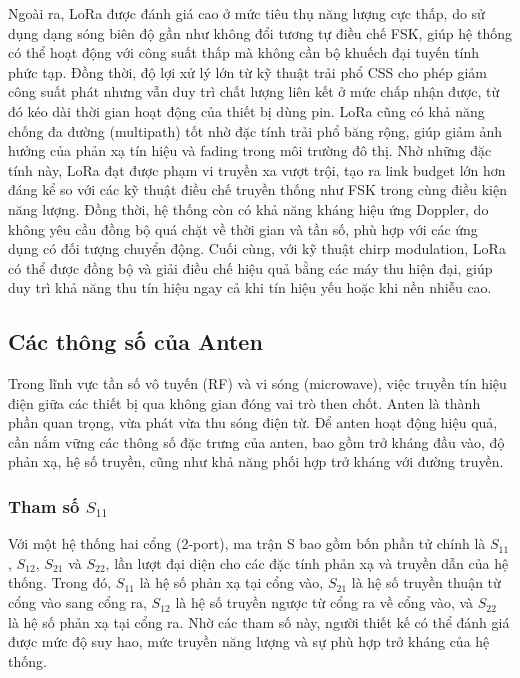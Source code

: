 \documentclass{article}
\begin{document}
	Ngoài ra, LoRa được đánh giá cao ở mức tiêu thụ năng lượng cực thấp, do sử dụng dạng sóng biên độ gần như không đổi tương tự điều chế FSK, giúp hệ thống có thể hoạt động với công suất thấp mà không cần bộ khuếch đại tuyến tính phức tạp. Đồng thời, độ lợi xử lý lớn từ kỹ thuật trải phổ CSS cho phép giảm công suất phát nhưng vẫn duy trì chất lượng liên kết ở mức chấp nhận được, từ đó kéo dài thời gian hoạt động của thiết bị dùng pin. LoRa cũng có khả năng chống đa đường (multipath) tốt nhờ đặc tính trải phổ băng rộng, giúp giảm ảnh hưởng của phản xạ tín hiệu và fading trong môi trường đô thị. Nhờ những đặc tính này, LoRa đạt được phạm vi truyền xa vượt trội, tạo ra link budget lớn hơn đáng kể so với các kỹ thuật điều chế truyền thống như FSK trong cùng điều kiện năng lượng. Đồng thời, hệ thống còn có khả năng kháng hiệu ứng Doppler, do không yêu cầu đồng bộ quá chặt về thời gian và tần số, phù hợp với các ứng dụng có đối tượng chuyển động. Cuối cùng, với kỹ thuật chirp modulation, LoRa có thể được đồng bộ và giải điều chế hiệu quả bằng các máy thu hiện đại, giúp duy trì khả năng thu tín hiệu ngay cả khi tín hiệu yếu hoặc khi nền nhiễu cao.
	
	\subsection{Các thông số của Anten}
	
	Trong lĩnh vực tần số vô tuyến (RF) và vi sóng (microwave), việc truyền tín hiệu điện giữa các thiết bị qua không gian đóng vai trò then chốt. Anten là thành phần quan trọng, vừa phát vừa thu sóng điện từ. Để anten hoạt động hiệu quả, cần nắm vững các thông số đặc trưng của anten, bao gồm trở kháng đầu vào, độ phản xạ, hệ số truyền, cũng như khả năng phối hợp trở kháng với đường truyền.
	
	\subsubsection{Tham số $S_{11}$}
	
	Với một hệ thống hai cổng (2-port), ma trận S bao gồm bốn phần tử chính là $S_{11}$, $S_{12}$, $S_{21}$ và $S_{22}$, lần lượt đại diện cho các đặc tính phản xạ và truyền dẫn của hệ thống. Trong đó, $S_{11}$ là hệ số phản xạ tại cổng vào, $S_{21}$ là hệ số truyền thuận từ cổng vào sang cổng ra, $S_{12}$ là hệ số truyền ngược từ cổng ra về cổng vào, và $S_{22}$ là hệ số phản xạ tại cổng ra. Nhờ các tham số này, người thiết kế có thể đánh giá được mức độ suy hao, mức truyền năng lượng và sự phù hợp trở kháng của hệ thống.
	
\end{document}
